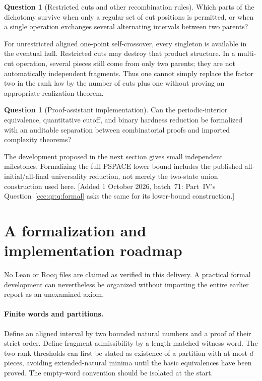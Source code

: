 \documentclass[11pt,letterpaper]{article}
\theoremstyle{definition}
\newtheorem{question}[theorem]{Question}
\theoremstyle{remark}
\newcommand{\waddsevone}[1]{\textup{[}Added 1 October 2026, batch~71: #1\textup{]}}
\begin{document}
\begin{question}[Restricted cuts and other recombination rules]
\label{ccc:ps:q:restricted}
Which parts of the dichotomy survive when only a regular set of cut
positions is permitted, or when a single operation exchanges several
alternating intervals between two parents?
\end{question}
For unrestricted aligned one-point self-crossover, every singleton is
available in the eventual hull. Restricted cuts may destroy that product
structure. In a multi-cut operation, several pieces still come from only
two parents; they are not automatically independent fragments. Thus one
cannot simply replace the factor two in the rank law by the number of
cuts plus one without proving an appropriate realization theorem.

\begin{question}[Proof-assistant implementation]\label{ccc:ps:q:formal}
Can the periodic-interior equivalence, quantitative cutoff, and binary
hardness reduction be formalized with an auditable separation between
combinatorial proofs and imported complexity theorems?
\end{question}
The development proposed in the next section gives small independent
milestones. Formalizing the full PSPACE lower bound includes the published
all-initial/all-final universality reduction, not merely the two-state
union construction used here.
\waddsevone{Part~IV's Question~\ref{ccc:qr:q:formal} asks the same for its
lower-bound construction.}

\section{A formalization and implementation roadmap}\label{ccc:ps:sec:formal}

No Lean or Rocq files are claimed as verified in this delivery. A practical
formal development can nevertheless be organized without importing the
entire earlier report as an unexamined axiom.

\paragraph{Finite words and partitions.}
Define an aligned interval by two bounded natural numbers and a proof of
their strict order. Define fragment admissibility by a length-matched
witness word. The two rank thresholds can first be stated as existence
of a partition with at most $d$ pieces, avoiding extended-natural minima
until the basic equivalences have been proved. The empty-word convention
should be isolated at the start.
\end{document}
